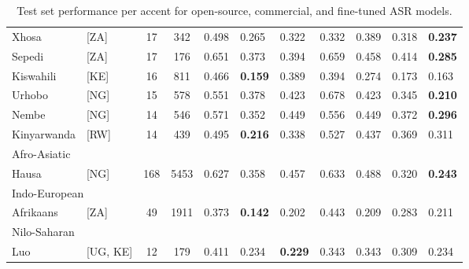 \documentclass[11pt,a4paper]{article}
\begin{document}
\begin{table*}
\begin{tabular}{l|l|c|c|l|l|l|l|l|l|l|}
Xhosa  &  [ZA] &  17 & 342&  0.498 &  0.265 &  0.322 &  0.332 &  0.389 &  0.318 & \textbf{0.237} \\
Sepedi  &   [ZA] & 17 &   176 &  0.651  &  0.373 &   0.394 &  0.659 &  0.458 & 0.414 & \textbf{0.285} \\
Kiswahili  &  [KE] &  16 & 811 &   0.466 &     \textbf{0.159} &  0.389 &  0.394 &  0.274 & 0.173 &0.163 \\
Urhobo &    [NG] &   15 &578&    0.551 &  0.378 &    0.423 &  0.678 &  0.423 &  0.345 &    \textbf{0.210} \\
Nembe & [NG] &  14 & 546 &  0.571 &   0.352 &  0.449 &  0.556 &  0.449 &  0.372 & \textbf{0.296} \\
Kinyarwanda  &  [RW] &  14 &439 &  0.495 & \textbf{0.216} &  0.338 &  0.527 &  0.437 &  0.369 &0.311 \\

\hline
\multicolumn{10}{l}{Afro-Asiatic}\\
\hline
Hausa & [NG] & 168 &5453& 0.627 & 0.358 & 0.457 &  0.633 &  0.488 & 0.320 & \textbf{0.243} \\

\hline
\multicolumn{10}{l}{Indo-European}\\
\hline
Afrikaans    & [ZA] & 49 &1911& 0.373 & \textbf{0.142} & 0.202 &  0.443 &  0.209 & 0.283 & 0.211 \\
\hline
\multicolumn{10}{l}{Nilo-Saharan}\\
\hline
Luo &  [UG, KE] & 12 &    179& 0.411 & 0.234 &  \textbf{0.229} &  0.343 &  0.343 & 0.309 & 0.234 \\
\bottomrule
\end{tabular}
\caption{Test set performance per accent  for open-source, commercial, and fine-tuned ASR models.}
\label{tab:top_accents_WER}
\end{table*}
\end{document}
